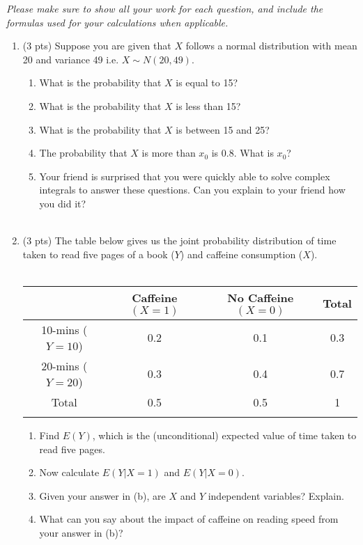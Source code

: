 \documentclass{./../../Latex/handout}
\begin{document}
\thispagestyle{plain}

\textit{Please make sure to show all your work for each question, and include the formulas used for your calculations when applicable.}

\begin{enumerate}

\item (3 pts) Suppose you are given that $X$ follows a normal distribution with mean 20 and variance 49 i.e. $X \sim N(20,49)$. 
 \begin{enumerate}
 \item What is the probability that $X$ is equal to 15? \vspace{1.25cm}
\item What is the probability that $X$ is less than 15? \vspace{2cm}
\item What is the probability that $X$ is between 15 and 25? \vspace{3cm}
\item The probability that $X$ is more than $x_0$ is 0.8. What is $x_0$? \vspace{3cm}
\item Your friend is surprised that you were quickly able to solve complex integrals to answer these questions. Can you explain to your friend how you did it? \\~\\
\end{enumerate} 

\newpage
\item (3 pts) The table below gives us the joint probability distribution of time taken to read five pages of a book ($Y$)  and caffeine consumption ($X$). \\~\\
\begin{tabularx}{0.95\textwidth}{cccc}
\toprule
	& Caffeine $(X=1)$ & No Caffeine $(X=0)$ & Total \\
	\midrule
10-mins ($Y=10$) & 0.2  & 0.1 & 0.3 \\ 
20-mins ($Y=20$) & 0.3 & 0.4 & 0.7 \\
\midrule
 Total & 0.5 & 0.5 & 1 \\
 \bottomrule \\
\end{tabularx}
\begin{enumerate}
\item Find $E(Y)$, which is the (unconditional) expected value of time taken to read five pages. \vspace{2.5cm}
\item Now calculate $E(Y|X=1)$ and $E(Y|X=0)$. \vspace{4.5cm}
\item Given your answer in (b), are $X$ and $Y$ independent variables? Explain. \vspace{3.25cm}
\item What can you say about the impact of caffeine on reading speed from your answer in (b)? \vspace{2cm}
\end{enumerate}


\end{enumerate}
\end{document}
